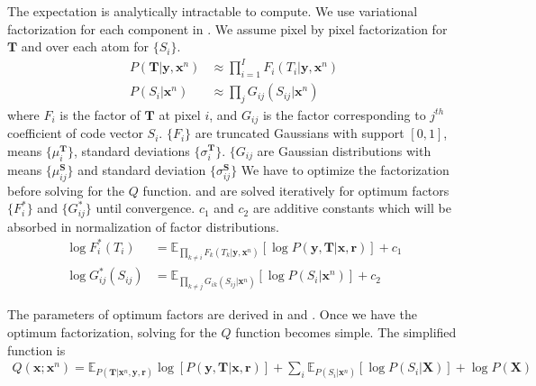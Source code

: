 The expectation is analytically intractable to compute. We use variational factorization for each component in . We assume pixel by pixel factorization for $\mathbf{T}$ and over each atom for $\lbrace S_i \rbrace$.
\begin{align}
    P \left( \mathbf{T} | \mathbf{y}, \mathbf{x}^n \right) &\approx \prod_{i=1}^{I} F_i \left( T_i | \mathbf{y}, \mathbf{x}^n \right) \label{eqn:vbFactT} \\
    P \left( S_i | \mathbf{x}^n \right) &\approx \prod_{j} G_{ij} (S_{ij} | \mathbf{x}^n) \label{eqn:vbFactS}
\end{align}
where $F_i$ is the factor of $\mathbf{T}$ at pixel $i$, and $G_{ij}$ is the factor corresponding to $j^{th}$ coefficient of code vector $S_i$. $\lbrace F_i \rbrace$ are truncated Gaussians with support $\left[0, 1 \right]$, means $\lbrace \mu^\mathbf{T}_i \rbrace$,  standard deviations $\lbrace \sigma^\mathbf{T}_i \rbrace$. $\lbrace G_{ij}$ are Gaussian distributions with means $ \lbrace \mu^{\mathbf{S}}_{ij} \rbrace $ and standard deviation $ \lbrace \sigma^{\mathbf{S}}_{ij} \rbrace $ We have to optimize the factorization before solving for the $Q$ function.  and  are solved iteratively for optimum factors $ \lbrace F_i^* \rbrace $ and $ \lbrace G_{ij}^* \rbrace $ until convergence. $c_1$ and $c_2$ are additive constants which will be absorbed in normalization of factor distributions.
\begin{align}
    \log F_i^* (T_i) &= \mathbb{E}_{ \prod_{k \neq i} F_k \left( T_k | \mathbf{y}, \mathbf{x}^n \right) } \left[ \log P \left( \mathbf{y}, \mathbf{T} | \mathbf{x}, \mathbf{r} \right) \right] + c_1 \label{eqn:solveFactT} \\
    \log G_{ij}^* \left( S_{ij} \right) &= \mathbb{E}_{ \prod_{k \neq j} G_{ik} \left( S_{ij} | \mathbf{x}^n \right) } \left[ \log P \left( S_i | \mathbf{x}^n \right)\right] + c_2 \label{eqn:solveFactS}
\end{align}

The parameters of optimum factors are derived in  and .  Once we have the optimum factorization, solving for the $Q$ function becomes simple. The simplified function is
\begin{align}
Q(\mathbf{x}; \mathbf{x}^n) = \mathbb{E}_{ P \left( \mathbf{T} | \mathbf{x}^n, \mathbf{y}, \mathbf{r} \right)} \log \left[ P \left( \mathbf{y}, \mathbf{T} | \mathbf{x}, \mathbf{r} \right) \right] + \sum_i \mathbb{E}_{ P \left( S_i | \mathbf{x}^n \right)} \left[ \log P \left( S_i | \mathbf{X} \right) \right] + \log P \left( \mathbf{X} \right) \label{eqn:QSimplified} 
\end{align}

